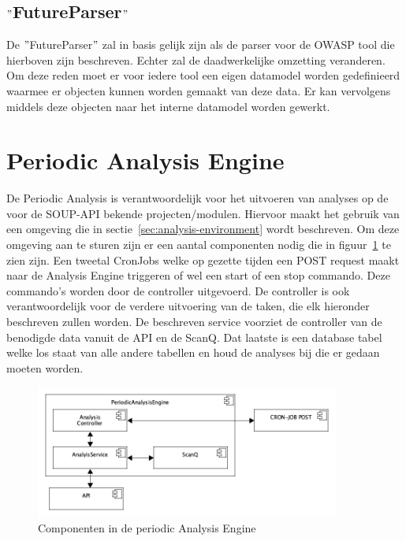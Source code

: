 \subsection{$"$FutureParser$"$}\label{subsec:$"$[future]parser$"$}
De $"$FutureParser$"$ zal in basis gelijk zijn als de parser voor de OWASP tool die hierboven zijn beschreven. Echter zal de daadwerkelijke omzetting veranderen. Om deze reden moet er voor iedere tool een eigen datamodel worden gedefinieerd waarmee er objecten kunnen worden gemaakt van deze data. Er kan vervolgens middels deze objecten naar het interne datamodel worden gewerkt.
\clearpage


\section{Periodic Analysis Engine}\label{sec:periodiek-analysis-engine}
De Periodic Analysis is verantwoordelijk voor het uitvoeren van analyses op de voor de SOUP-API bekende projecten/modulen. Hiervoor maakt het gebruik van een omgeving die in sectie~\ref{sec:analysis-environment} wordt beschreven. Om deze omgeving aan te sturen zijn er een aantal componenten nodig die in figuur~\ref{fig:paeComps} te zien zijn. Een tweetal CronJobs welke op gezette tijden een POST request maakt naar de Analysis Engine triggeren of wel een start of een stop commando. Deze commando's worden door de controller uitgevoerd. De controller is ook verantwoordelijk voor de verdere uitvoering van de taken, die elk hieronder beschreven zullen worden. De beschreven service voorziet de controller van de benodigde data vanuit de API en de ScanQ. Dat laatste is een database tabel welke los staat van alle andere tabellen en houd de analyses bij die er gedaan moeten worden.
\begin{figure}[bth]
    \myfloatalign
    \includegraphics[width=10cm]{gfx/umlet/exports/PeriodicAnalyisEngineComponents}
    \caption{Componenten in de periodic Analysis Engine}
    \label{fig:paeComps}
\end{figure}
